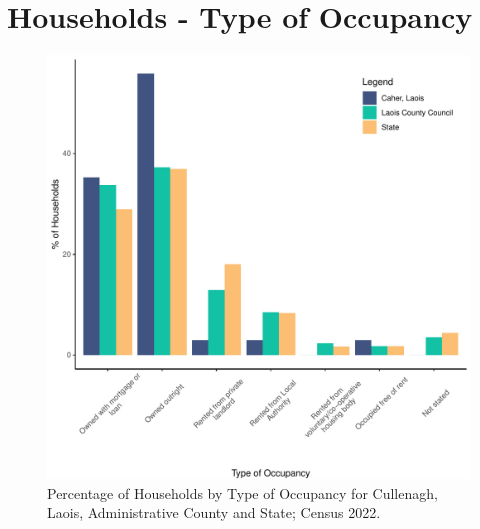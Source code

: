\documentclass{article}
\begin{document}
\section{Households - Type of Occupancy}\label{sect:Households}
\begin{figure}[H]
	\centering
	\includegraphics[width = 140mm]{../figures/HouseholdsED.pdf}
	\caption{Percentage of Households by Type of Occupancy for Cullenagh, Laois, Administrative County and State; Census 2022.}
	\label{fig:vbnv}
	\end{figure}
\end{document}
